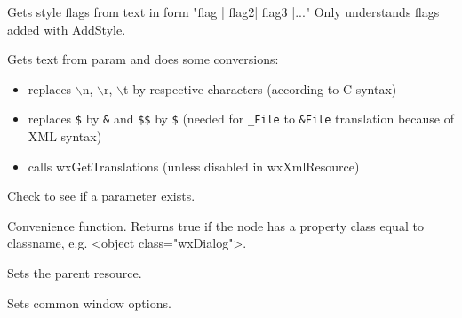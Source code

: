 
Gets style flags from text in form "flag | flag2| flag3 |..."
Only understands flags added with AddStyle.

\label{wxxmlresourcehandlergettext}


Gets text from param and does some conversions:

\begin{itemize}\itemsep=0pt
\item replaces $\backslash$n, $\backslash$r, $\backslash$t by respective characters (according to C syntax)
\item replaces {\tt\$} by {\tt\&} and {\tt\$\$} by {\tt\$} (needed for {\tt\_File} to {\tt\&File}
translation because of XML syntax)
\item calls wxGetTranslations (unless disabled in wxXmlResource)
\end{itemize}

\label{wxxmlresourcehandlerhasparam}


Check to see if a parameter exists.

\label{wxxmlresourcehandlerisofclass}


Convenience function. Returns true if the node has a property class equal to classname,
e.g. <object class="wxDialog">.

\label{wxxmlresourcehandlersetparentresource}


Sets the parent resource.

\label{wxxmlresourcehandlersetupwindow}


Sets common window options.

